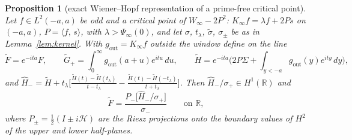 \documentclass[11pt]{article}
\newtheorem{proposition}[theorem]{Proposition}
\theoremstyle{definition}
\theoremstyle{remark}
\newcommand{\R}{\mathbb{R}}
\newcommand{\ip}[2]{\langle #1,\, #2\rangle}
\begin{document}
\begin{proposition}[exact Wiener--Hopf representation of a prime-free critical point]\label{prop:whexact}
Let $f\in L^2(-a,a)$ be odd and a critical point of $W_\infty-2P^2$: $K_\infty f=\lambda f+2Ps$ on $(-a,a)$, $P=\ip fs$, with $\lambda>\Psi_\infty(0)$, and let $\sigma$, $t_\lambda$, $\tilde\sigma$, $\sigma_\pm$ be as in Lemma~\ref{lem:kernel}. With $g_{\mathrm{out}}=K_\infty f$ outside the window define on the line
\[
\tilde F=e^{-ita}F,\qquad \tilde G_+=\int_0^\infty g_{\mathrm{out}}(a+u)e^{itu}\,du,\qquad \tilde H=e^{-ita}\Big(2P\Sigma+\int_{y<-a}g_{\mathrm{out}}(y)e^{ity}\,dy\Big),
\]
and $\hat H_-=\tilde H+t_\lambda\big[\frac{\tilde H(t)-\tilde H(t_\lambda)}{t-t_\lambda}-\frac{\tilde H(t)-\tilde H(-t_\lambda)}{t+t_\lambda}\big]$. Then $\hat H_-/\sigma_+\in H^1(\R)$ and
\begin{equation}\label{eq:whexact}
\tilde F=\frac{P_-\big[\hat H_-/\sigma_+\big]}{\sigma_-}\qquad\text{on }\R ,
\end{equation}
where $P_\pm=\frac12(I\pm i\mathcal H)$ are the Riesz projections onto the boundary values of $H^2$ of the upper and lower half-planes.
\end{proposition}
\end{document}
